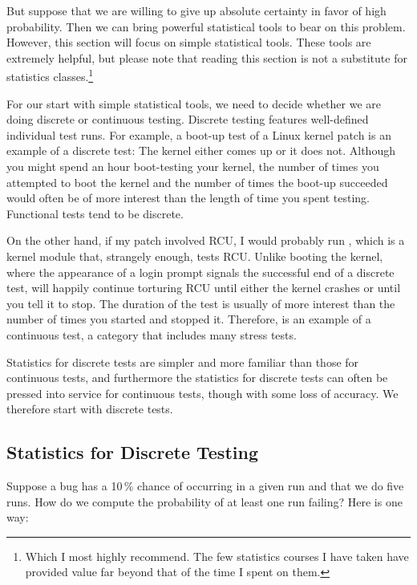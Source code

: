 But suppose that we are willing to give up absolute certainty in favor
of high probability.
Then we can bring powerful statistical tools to bear on this problem.
However, this section will focus on simple statistical tools.
These tools are extremely helpful, but please note that reading this
section is not a substitute for statistics classes.\footnote{
	Which I most highly recommend.
	The few statistics courses I have taken have provided value
	far beyond that of the time I spent on them.}

For our start with simple statistical tools, we need to decide whether
we are doing discrete or continuous testing.
Discrete testing features well-defined individual test runs.
For example, a boot-up test of a Linux kernel patch is an example
of a discrete test:
The kernel either comes up or it does not.
Although you might spend an hour boot-testing your kernel, the number of
times you attempted to boot the kernel and the number of times the
boot-up succeeded would often be of more interest than the length
of time you spent testing.
Functional tests tend to be discrete.

On the other hand, if my patch involved RCU, I would probably run
, which is a kernel module that, strangely enough, tests RCU\@.
Unlike booting the kernel, where the appearance of a login prompt
signals the successful end of a discrete test,  will happily
continue torturing RCU until either the kernel crashes or until you
tell it to stop.
The duration of the  test is usually of more
interest than the number of times you started and stopped it.
Therefore,  is an example of a continuous test, a category
that includes many stress tests.

Statistics for discrete tests are simpler and more familiar than those
for continuous tests, and furthermore the statistics for discrete tests
can often be pressed into service for continuous tests, though with some
loss of accuracy.
We therefore start with discrete tests.

\subsection{Statistics for Discrete Testing}
\label{sec:debugging:Statistics for Discrete Testing}

Suppose a bug has a 10\,\% chance of occurring in a given run and that
we do five runs.
How do we compute the probability of at least one run failing?
Here is one way:

